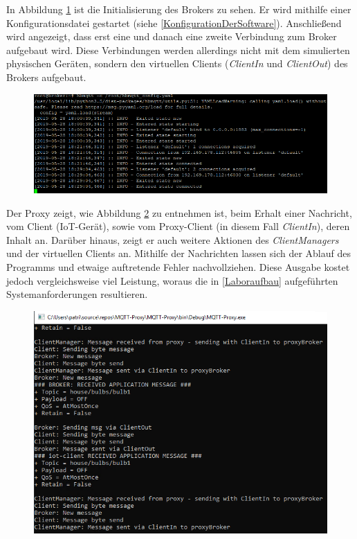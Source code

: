     In Abbildung \ref{fig:broker_connections} ist die Initialisierung des Brokers zu sehen. Er wird mithilfe einer Konfigurationsdatei gestartet (siehe \ref{KonfigurationDerSoftware}). Anschließend wird angezeigt, dass erst eine und danach eine zweite Verbindung zum Broker aufgebaut wird. Diese Verbindungen werden allerdings nicht mit dem simulierten physischen Geräten, sondern den virtuellen Clients (\emph{ClientIn} und \emph{ClientOut}) des Brokers aufgebaut.
    \begin{figure}[!h]%
        \centering
        \includegraphics[width=14cm]{tex/bilder/6_validierung/BrokerConnections.png}
        \label{fig:broker_connections}
    \end{figure}
    
    Der Proxy zeigt, wie Abbildung \ref{fig:proxy_messages} zu entnehmen ist, beim Erhalt einer Nachricht, vom Client (\ac{IoT}-Gerät), sowie vom Proxy-Client (in diesem Fall \emph{ClientIn}), deren Inhalt an.
    Darüber hinaus, zeigt er auch weitere Aktionen des \emph{ClientManagers} und der virtuellen Clients an.
    Mithilfe der Nachrichten lassen sich der Ablauf des Programms und etwaige auftretende Fehler nachvollziehen. Diese Ausgabe kostet jedoch vergleichsweise viel Leistung, woraus die in \ref{Laboraufbau} aufgeführten Systemanforderungen resultieren. 
    \begin{figure}[!h]%
        \centering
        \includegraphics[width=12cm]{tex/bilder/6_validierung/ProxyMessages.png}
        \label{fig:proxy_messages}
    \end{figure}
    
